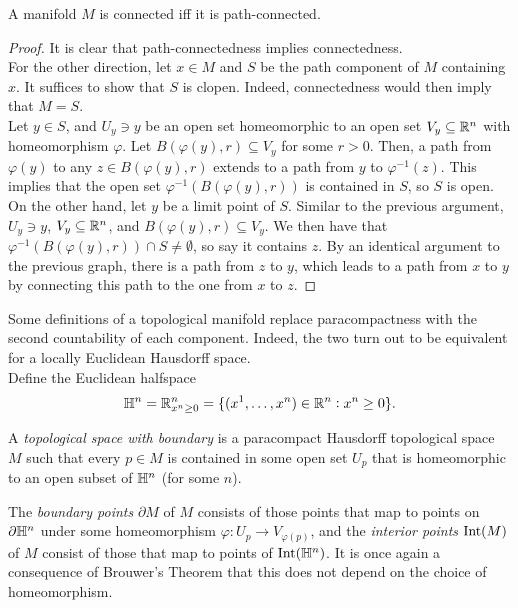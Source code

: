 \begin{prop}
	A manifold $M$ is connected iff it is path-connected.
\end{prop}
\begin{proof}
	It is clear that path-connectedness implies connectedness.\\
	For the other direction, let $x \in M$ and $S$ be the path component of $M$ containing $x$. It suffices to show that $S$ is clopen. Indeed, connectedness would then imply that $M = S$.\\
	Let $y \in S$, and $U_y \ni y$ be an open set homeomorphic to an open set $V_y \subseteq \mathbb{R}^n$ with homeomorphism $\varphi$. Let $B(\varphi(y),r) \subseteq V_y$ for some $r > 0$. Then, a path from $\varphi(y)$ to any $z \in B(\varphi (y),r)$ extends to a path from $y$ to $\varphi^{-1}(z)$. This implies that the open set $\varphi^{-1}(B(\varphi(y),r))$ is contained in $S$, so $S$ is open.\\
	On the other hand, let $y$ be a limit point of $S$. Similar to the previous argument, $U_y \ni y$, $V_y \subseteq \mathbb{R}^n$, and $B(\varphi(y),r) \subseteq V_y$. We then have that $\varphi^{-1}(B(\varphi(y),r)) \cap S \ne \emptyset$, so say it contains $z$. By an identical argument to the previous graph, there is a path from $z$ to $y$, which leads to a path from $x$ to $y$ by connecting this path to the one from $x$ to $z$.
\end{proof}

Some definitions of a topological manifold replace paracompactness with the second countability of each component. Indeed, the two turn out to be equivalent for a locally Euclidean Hausdorff space.\\

Define the Euclidean halfspace
\[ \mathbb{H}^n = \mathbb{R}^n_{x^n \ge 0} = \{ (x^1,\ldots,x^n) \in \mathbb{R}^n : x^n \ge 0 \}. \]

\begin{fdef}
	A \emph{topological space with boundary} is a paracompact Hausdorff topological space $M$ such that every $p \in M$ is contained in some open set $U_p$ that is homeomorphic to an open subset of $\mathbb{H}^n$ (for some $n$).
\end{fdef}
The \emph{boundary points} $\partial M$ of $M$ consists of those points that map to points on $\partial\mathbb{H}^n$ under some homeomorphism $\varphi: U_p \to V_{\varphi(p)}$, and the \emph{interior points} $\operatorname{Int}(M)$ of $M$ consist of those that map to points of $\operatorname{Int}(\mathbb{H}^n)$. It is once again a consequence of Brouwer's Theorem that this does not depend on the choice of homeomorphism.\\

